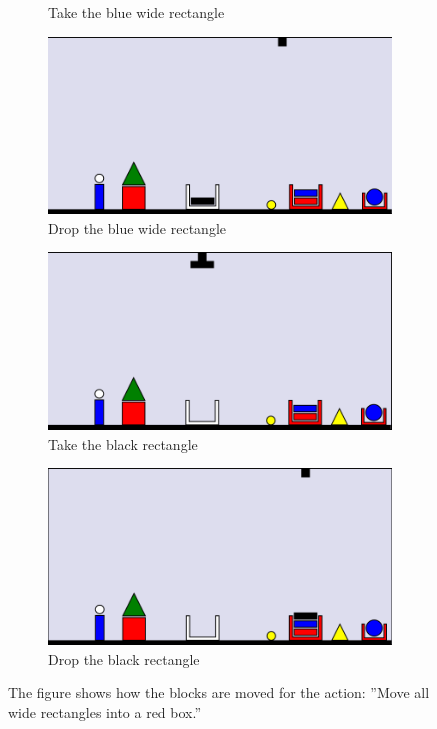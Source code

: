 \begin{figure}
\begin{subfigure}{.5\textwidth}
  \caption{Take the blue wide rectangle}
  \label{fig:8}
\end{subfigure}
\begin{subfigure}{.5\textwidth}
  \centering
  \includegraphics[width=.7\linewidth]{fig/9.png}
  \caption{Drop the blue wide rectangle}
  \label{fig:9}
\end{subfigure}%
\begin{subfigure}{.5\textwidth}
  \centering
  \includegraphics[width=.7\linewidth]{fig/10.png}
  \caption{Take the black rectangle}
  \label{fig:10}
\end{subfigure}
\begin{subfigure}{.5\textwidth}
  \centering
  \includegraphics[width=.7\linewidth]{fig/11.png}
  \caption{Drop the black rectangle}
  \label{fig:11}
\end{subfigure}
\caption{The figure shows how the blocks are moved for the action: ''Move all wide rectangles into a red 
box.''}
\label{fig:moveex}
\end{figure}\\\\\\
